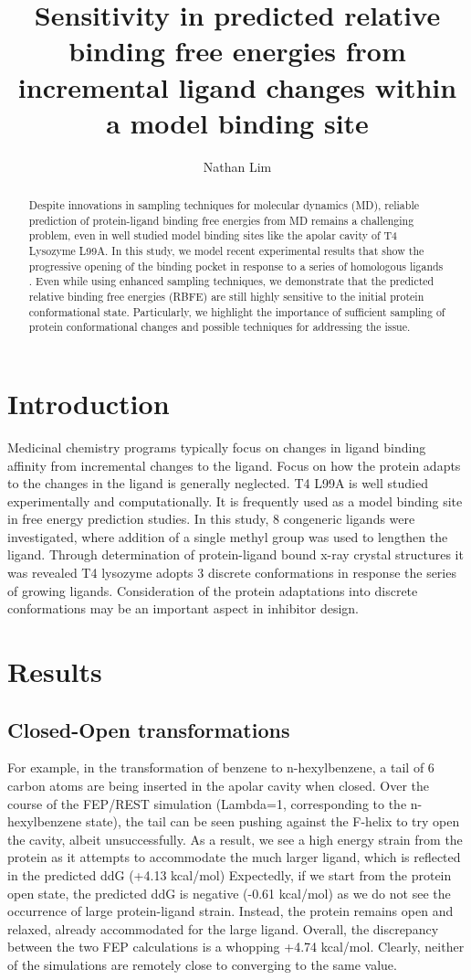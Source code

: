 \documentclass[journal=jctcce,manuscript=article]{achemso}
\author{Nathan Lim}
\affiliation[University of California, Irvine]
{Department of Pharmaceutical Sciences}
\title{Sensitivity in predicted relative binding free energies from incremental ligand changes within a model binding site}
\begin{document}
\begin{abstract}
Despite innovations in sampling techniques for molecular dynamics (MD), reliable prediction of protein-ligand binding free energies from MD remains a challenging problem, even in well studied model binding sites like the apolar cavity of T4 Lysozyme L99A\cite{Boyce2009}.
In this study, we model recent experimental results that show the progressive opening of the binding pocket in response to a series of homologous ligands \cite{Merski2015}.
Even while using enhanced sampling techniques, we demonstrate that the predicted relative binding free energies (RBFE) are still highly sensitive to the initial protein conformational state.
Particularly, we highlight the importance of sufficient sampling of protein conformational changes and possible techniques for addressing the issue.
\end{abstract}

\pagebreak

\section{Introduction}
Medicinal chemistry programs typically focus on changes in ligand binding affinity from incremental changes to the ligand.
Focus on how the protein adapts to the changes in the ligand is generally neglected.
T4 L99A is well studied experimentally and computationally.
It is frequently used as a model binding site in free energy prediction studies.
In this study, 8 congeneric ligands were investigated, where addition of a single methyl group was used to lengthen the ligand.
Through determination of protein-ligand bound x-ray crystal structures it was revealed T4 lysozyme adopts 3 discrete conformations in response the series of growing ligands.
Consideration of the protein adaptations into discrete conformations may be an important aspect in inhibitor design.

\section{Results}
\subsection*{Closed-Open transformations}
For example, in the transformation of benzene to n-hexylbenzene, a tail of 6 carbon atoms are being inserted in the apolar cavity when closed.
Over the course of the FEP/REST simulation (Lambda=1, corresponding to the n-hexylbenzene state), the tail can be seen pushing against the F-helix to try open the cavity, albeit unsuccessfully.
As a result, we see a high energy strain from the protein as it attempts to accommodate the much larger ligand, which is reflected in the predicted ddG (+4.13 kcal/mol)
Expectedly, if we start from the protein open state, the predicted ddG is negative (-0.61 kcal/mol) as we do not see the occurrence of large protein-ligand strain.
Instead, the protein remains open and relaxed, already accommodated for the large ligand.
Overall, the discrepancy between the two FEP calculations is a whopping +4.74 kcal/mol.
Clearly, neither of the simulations are remotely close to converging to the same value.
\end{document}

